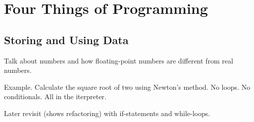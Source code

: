 \chapter{Four Things of Programming}

\section{Storing and Using Data}

Talk about numbers and how floating-point numbers are different from real numbers.

Example. Calculate the square root of two using Newton's method. No loops. No conditionals. All in the iterpreter.

Later revisit (shows refactoring) with if-statements and while-loops.
